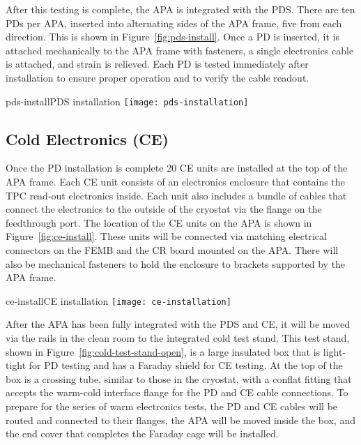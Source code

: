 After this testing is complete, the APA is integrated with the PDS.  There are ten PDs per APA, inserted into alternating sides of the APA frame, %
five from each direction.  This is shown in Figure~\ref{fig:pds-install}.  Once a PD is inserted, it is attached mechanically to the APA frame with fasteners, a single electronics cable is attached, and strain is relieved.  Each PD is tested immediately after installation to ensure proper operation and to verify the cable readout.  

\begin{cdrfigure}{pds-install}{PDS installation}
\texttt{[image: pds-installation]}
\end{cdrfigure}

\subsection{Cold Electronics (CE)}
\label{subsec:ce_install}

Once the PD installation is complete 20 CE units are installed at the top of the APA frame.  Each CE unit consists of an electronics enclosure that contains the TPC read-out electronics inside.  Each unit also includes a bundle of cables that connect the electronics to the outside of the cryostat via the flange on the feedthrough port.  %
The location of the CE units on the APA is shown in Figure~\ref{fig:ce-install}.  These units will be connected via matching electrical connectors on the FEMB and the CR board mounted on the APA.  There will also be mechanical fasteners to hold the enclosure to brackets supported by the APA frame.  %

\begin{cdrfigure}[CE installation]{ce-install}{CE installation}
\texttt{[image: ce-installation]}
\end{cdrfigure}

After the APA has been fully integrated with the PDS and CE, it will be moved via the rails in the clean room to the integrated cold test stand.  This test stand, shown in Figure~\ref{fig:cold-test-stand-open}, is a large insulated box that is light-tight for PD testing and has a Faraday shield for CE testing.  At the top of the box is a crossing tube, similar to those in the cryostat, with a conflat fitting that accepts the warm-cold interface flange for the PD and CE cable connections.  To prepare for the series of warm electronics tests, the PD and CE cables will be routed and connected to their flanges, the APA will be moved inside the box, and the end cover that completes the Faraday cage will be installed.  %

